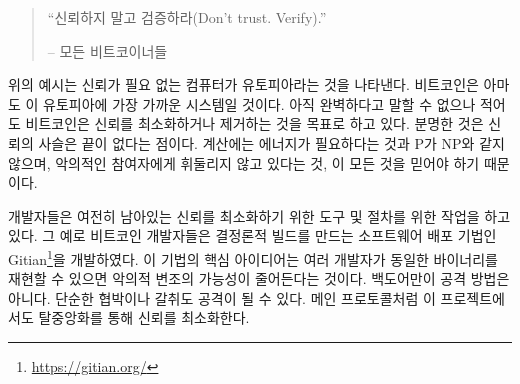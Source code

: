 \begin{quotation}\begin{samepage}
\enquote{신뢰하지 말고 검증하라(Don’t trust. Verify).}
\begin{flushright} -- 모든 비트코이너들
\end{flushright}\end{samepage}\end{quotation}

\begin{comment}
The above examp과과es should illustrate that \textit{trustless} computing is
utopic. Bitcoin is probably the one system which comes closest to this
utopia, but still, it is \textit{trust-minimized} --- aiming to remove trust
wherever possible. Arguably, the chain-of-trust is neverending, since
you will also have to trust that computation requires energy, that P
does not equal NP, and that you are actually in base reality and not
imprisoned in a simulation by malicious actors.
\end{comment}
위의 예시는 신뢰가 필요 없는 컴퓨터가 유토피아라는 것을 나타낸다.
비트코인은 아마도 이 유토피아에 가장 가까운 시스템일 것이다.
아직 완벽하다고 말할 수 없으나 적어도 비트코인은 신뢰를 최소화하거나 제거하는 것을 목표로 하고 있다.
분명한 것은 신뢰의 사슬은 끝이 없다는 점이다.
계산에는 에너지가 필요하다는 것과 P가 NP와 같지 않으며, 
악의적인 참여자에게 휘둘리지 않고 있다는 것, 이 모든 것을 믿어야 하기 때문이다.

\begin{comment}
Developers are working on tools and procedures to minimize any remaining trust
even further. For example, Bitcoin developers created
Gitian\footnote{\url{https://gitian.org/}}, which is a software distribution
method to create deterministic builds. The idea is that if multiple developers
are able to reproduce identical binaries, the chance of malicious tampering is
reduced. Fancy backdoors aren't the only attack vector. Simple blackmail or
extortion are real threats as well. As in the main protocol, decentralization is
used to minimize trust.
\end{comment}
개발자들은 여전히 남아있는 신뢰를 최소화하기 위한 도구 및 절차를 위한 작업을 하고 있다.
그 예로 비트코인 개발자들은 결정론적 빌드를 만드는 소프트웨어 배포 기법인 Gitian\footnote{\url{https://gitian.org/}}을 개발하였다.
이 기법의 핵심 아이디어는 여러 개발자가 동일한 바이너리를 재현할 수 있으면 악의적 변조의 가능성이 줄어든다는 것이다.
백도어만이 공격 방법은 아니다. 단순한 협박이나 갈취도 공격이 될 수 있다.
메인 프로토콜처럼 이 프로젝트에서도 탈중앙화를 통해 신뢰를 최소화한다.


